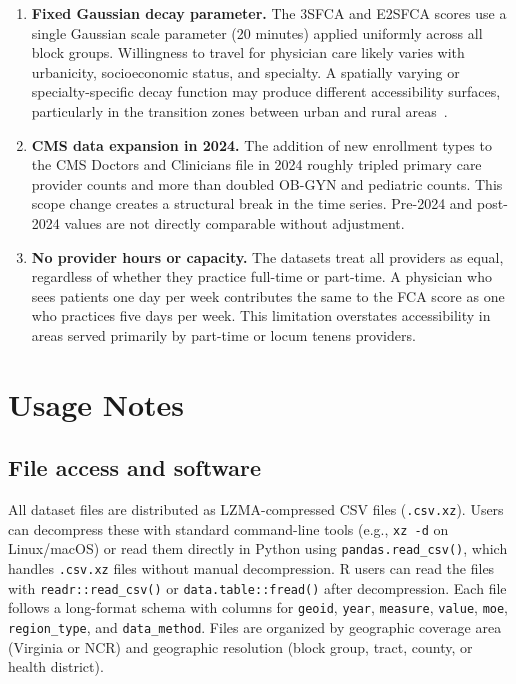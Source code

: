 \documentclass{CUP-JNL-DAP}%
\begin{document}
\begin{enumerate}
\item \textbf{Fixed Gaussian decay parameter.} The 3SFCA and E2SFCA scores use a single Gaussian scale parameter (20 minutes) applied uniformly across all block groups. Willingness to travel for physician care likely varies with urbanicity, socioeconomic status, and specialty. A spatially varying or specialty-specific decay function may produce different accessibility surfaces, particularly in the transition zones between urban and rural areas~\citep{mcgrail2009}.

\item \textbf{CMS data expansion in 2024.} The addition of new enrollment types to the CMS Doctors and Clinicians file in 2024 roughly tripled primary care provider counts and more than doubled OB-GYN and pediatric counts. This scope change creates a structural break in the time series. Pre-2024 and post-2024 values are not directly comparable without adjustment.

\item \textbf{No provider hours or capacity.} The datasets treat all providers as equal, regardless of whether they practice full-time or part-time. A physician who sees patients one day per week contributes the same to the FCA score as one who practices five days per week. This limitation overstates accessibility in areas served primarily by part-time or locum tenens providers.
\end{enumerate}


\section{Usage Notes}

\subsection{File access and software}

All dataset files are distributed as LZMA-compressed CSV files (\texttt{.csv.xz}). Users can decompress these with standard command-line tools (e.g., \texttt{xz -d} on Linux/macOS) or read them directly in Python using \texttt{pandas.read\_csv()}, which handles \texttt{.csv.xz} files without manual decompression. R users can read the files with \texttt{readr::read\_csv()} or \texttt{data.table::fread()} after decompression. Each file follows a long-format schema with columns for \texttt{geoid}, \texttt{year}, \texttt{measure}, \texttt{value}, \texttt{moe}, \texttt{region\_type}, and \texttt{data\_method}. Files are organized by geographic coverage area (Virginia or NCR) and geographic resolution (block group, tract, county, or health district).
\end{document}
